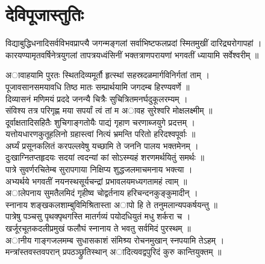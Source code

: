 
\section*{देविपूजास्तुतिः}

विद्याबुद्धिधनादिसर्वविभवप्राप्त्यै जगन्मङ्गलां
सर्वाभिष्टफलप्रदां स्मितमुखीं दारिद्र्यरोगापहां ।
कारयण्यामृतवर्षिनेत्रयुगलां तापत्रयध्वंसिनीं
भक्तत्राणपरायणां भगवतीं ध्यायामि सर्वेश्वरीम् ॥

अावाहयामि पुरतः स्थितदिव्यमूर्तौ हृत्स्थां सहस्रदळमार्गविनिर्गतां ताम् ।\\
पूजावसानसमयावधि तिष्ठ मातः सम्प्रार्थयामि जगदम्ब हिरण्यवर्णे ॥\\[10pt]

दिव्यासनं मणिमयं प्रददे जनन्यै चित्रैः सुचित्रितमनर्घदुकूलरम्यम् ।\\
संविश्य तत्र परिगृह्ण मया सपर्यां त्वं तां म अावह सुरेश्वरि मोक्षलक्ष्मीम् ॥\\[10pt]

दूर्वाक्षतादिसहितैः शुचिगाङ्गतोयैः पाद्यं गृहाण चरणाब्जयुगे प्रदत्तम् ।\\
यत्तोयधारणकुतूहलिनो ग्रहास्त्वां नित्यं भ्रमन्ति परितो हरिदश्वपूर्वाः ॥\\[10pt]

अर्घ्यं प्रसूनकलितं करपल्लवेषु यच्छामि ते जननि पालय भक्तमेनम् ।\\
दुःखाग्नितप्तहृदयः सदयां त्वदन्यां कां सोऽस्म्यहं शरणमर्थयितुं समर्थः ॥\\[10pt]

पात्रे सुवर्णरचितेम्ब सुरापगाया निक्षिप्य शुद्धजलमाचमनाय भक्त्या ।\\
अभ्यर्थये भगवतीं नयनस्थसूर्यचन्द्रां प्रभावलयमध्यगतामहं त्वाम् ॥\\[10pt]

अालेपनाय सुमतैलमिदं गृहीष्व चोद्वर्तनाय हरिचन्दनकुङ्कुमादीन् ।\\
स्नानाय शङ्खकलशाम्बुविमिश्रितास्ता अापो हि ते तनुमलान्यपकर्षयन्तु ॥\\[10pt]

पात्रेषु पञ्चसु पृथक्पृथगस्ति मातर्गव्यं पयोदधियुतं मधु शर्करा च ।\\
खर्जूरचूतकदलीप्रमुखं फलौघं स्नानाय ते भवतु सर्वमिदं पुरस्थम् ॥\\[10pt]

अानीय गाङ्गजलमम्ब सुधासकाशं संमिश्र्य रोचनमुखान् स्नपयामि तेऽहम् ।\\
मन्त्रांस्तवस्तवपरान् प्रपठञ्छ्रुतिस्थान्  अादित्यवद्वपुरिदं कुरु कान्तियुक्तम् ॥\\[10pt]

